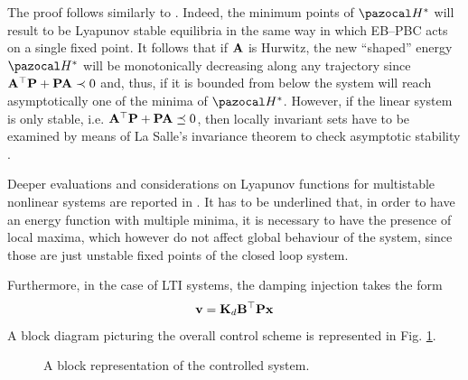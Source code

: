 %
\proof
The proof follows similarly to \citep{ortega2008control}. Indeed, the minimum points of $\Ha^*$ will result to be Lyapunov stable equilibria in the same way in which EB--PBC acts on a single fixed point. It follows that if $\mathbf{A}$ is Hurwitz, the new ``shaped'' energy $\Ha^*$ will be monotonically decreasing along any trajectory since $\mathbf{A}^\top \mathbf{P} + \mathbf{P}\mathbf{A}\prec 0$ and, thus, if it is bounded from below the system will reach asymptotically one of the minima of $\Ha^*$. However, if the linear system is only stable, i.e. $\mathbf{A}^\top \mathbf{P} + \mathbf{P}\mathbf{A}\preceq 0$, then locally invariant sets have to be examined by means of La Salle’s invariance theorem to check asymptotic stability \citep{khalil2002nonlinear}.
\endproof
%
\begin{rem}
	Deeper evaluations and considerations on Lyapunov functions for multistable nonlinear systems are reported in \cite{efimov2012global}. It has to be underlined that, in order to have an energy function with multiple minima, it is necessary to have the presence of local maxima, which however do not affect global behaviour of the system, since those are just unstable fixed points of the closed loop system.
	
\end{rem}
%
Furthermore, in the case of LTI systems, the damping injection takes the form
\begin{equation}
    \mathbf{v} = \mathbf{K}_d\mathbf{B}^\top\mathbf{P}\mathbf{x}
\end{equation}
A block diagram  picturing the overall control scheme is represented in Fig. \ref{fig:block}.
%
\begin{figure}[!h]
	\centering
	
	\caption{A block representation of the controlled system.}
	\label{fig:block}
\end{figure}
%
